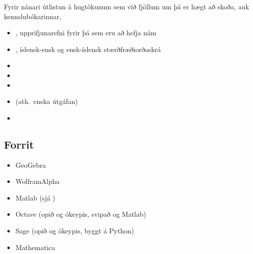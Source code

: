 \documentclass[b5paper,10pt,icelandic]{sphinxmanual}
\begin{document}
Fyrir nánari útlistun á hugtökunum sem við fjöllum um þá er hægt að skoða,
auk kennslubókarinnar,
\begin{itemize}
\item {} 
, upprifjunarefni fyrir þá sem eru að hefja nám

\item {} 
, íslensk-ensk og ensk-íslensk stærðfræðiorðaskrá

\item {} 

\item {} 

\item {} 

\item {} 
 (ath. enska útgáfan)

\item {} 

\end{itemize}


\subsection{Forrit}
\label{\detokenize{vidauki:forrit}}\begin{itemize}
\item {} 
GeoGebra 

\item {} 
WolframAlpha 

\item {} 
Matlab 
(sjá )

\item {} 
Octave  (opið og ókeypis, svipað og Matlab)

\item {} 
Sage   (opið og ókeypis, byggt á Python)

\item {} 
Mathematica 

\end{itemize}
\end{document}
